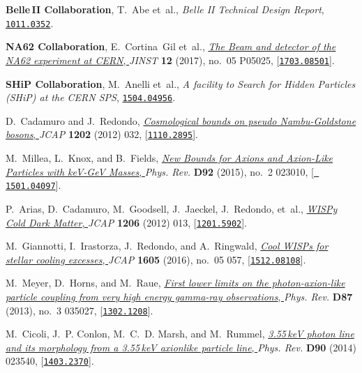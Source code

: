 \documentclass[11pt,a4paper]{article}
\begin{document}
\begin{thebibliography}{10}
{\bf Belle\,II Collaboration}, T.~Abe et~al., {\it {Belle II Technical Design
  Report}},  \href{http://arxiv.org/abs/1011.0352}{{\tt 1011.0352}}.

{\bf NA62 Collaboration}, E.~Cortina~Gil et~al.,
  \href{http://dx.doi.org/10.1088/1748-0221/12/05/P05025}{{\it {The Beam and
  detector of the NA62 experiment at CERN}}, } {\em JINST} {\bf 12} (2017),
  no.~05 P05025, [\href{http://arxiv.org/abs/1703.08501}{{\tt 1703.08501}}].

{\bf SHiP Collaboration}, M.~Anelli et~al., {\it {A facility to Search for
  Hidden Particles (SHiP) at the CERN SPS}},
  \href{http://arxiv.org/abs/1504.04956}{{\tt 1504.04956}}.

D.~Cadamuro and J.~Redondo,
  \href{http://dx.doi.org/10.1088/1475-7516/2012/02/032}{{\it {Cosmological
  bounds on pseudo Nambu-Goldstone bosons}}, } {\em JCAP} {\bf 1202} (2012)
  032, [\href{http://arxiv.org/abs/1110.2895}{{\tt 1110.2895}}].

M.~Millea, L.~Knox, and B.~Fields,
  \href{http://dx.doi.org/10.1103/PhysRevD.92.023010}{{\it {New Bounds for
  Axions and Axion-Like Particles with keV-GeV Masses}}, } {\em Phys. Rev.}
  {\bf D92} (2015), no.~2 023010, [\href{http://arxiv.org/abs/1501.04097}{{\tt
  1501.04097}}].

P.~Arias, D.~Cadamuro, M.~Goodsell, J.~Jaeckel, J.~Redondo, et~al.,
  \href{http://dx.doi.org/10.1088/1475-7516/2012/06/013}{{\it {WISPy Cold Dark
  Matter}}, } {\em JCAP} {\bf 1206} (2012) 013,
  [\href{http://arxiv.org/abs/1201.5902}{{\tt 1201.5902}}].

M.~Giannotti, I.~Irastorza, J.~Redondo, and A.~Ringwald,
  \href{http://dx.doi.org/10.1088/1475-7516/2016/05/057}{{\it {Cool WISPs for
  stellar cooling excesses}}, } {\em JCAP} {\bf 1605} (2016), no.~05 057,
  [\href{http://arxiv.org/abs/1512.08108}{{\tt 1512.08108}}].

M.~Meyer, D.~Horns, and M.~Raue,
  \href{http://dx.doi.org/10.1103/PhysRevD.87.035027}{{\it {First lower limits
  on the photon-axion-like particle coupling from very high energy gamma-ray
  observations}}, } {\em Phys. Rev.} {\bf D87} (2013), no.~3 035027,
  [\href{http://arxiv.org/abs/1302.1208}{{\tt 1302.1208}}].

M.~Cicoli, J.~P. Conlon, M.~C.~D. Marsh, and M.~Rummel,
  \href{http://dx.doi.org/10.1103/PhysRevD.90.023540}{{\it {3.55\,keV photon
  line and its morphology from a 3.55\,keV axionlike particle line}}, } {\em
  Phys. Rev.} {\bf D90} (2014) 023540,
  [\href{http://arxiv.org/abs/1403.2370}{{\tt 1403.2370}}].


\end{thebibliography}
\end{document}
